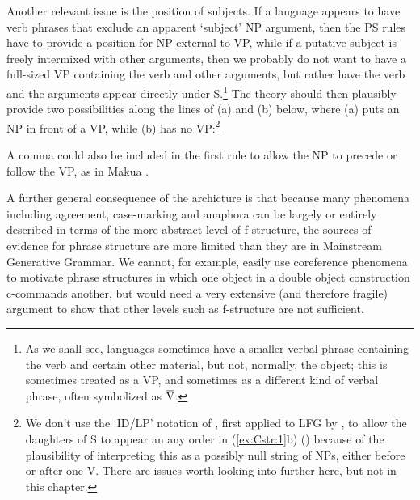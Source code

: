 \documentclass[output=paper,hidelinks]{langscibook}
\begin{document}
Another relevant issue is the position of subjects. If a language
appears to have verb phrases that exclude an apparent `subject' NP argument, then
the PS rules have to provide a position for NP external to VP, while if a
putative subject is freely intermixed with other arguments, then we probably
do not want to have a full-sized VP containing the verb and other arguments,
but rather have the verb and the arguments appear
directly under S.\footnote
 {As we shall see, languages sometimes have a smaller verbal phrase containing
 the verb and certain other material, but not, normally, the object; this is
 sometimes treated as a VP, and sometimes as a different kind of verbal phrase,
 often symbolized as $\overline{\hbox{V}}$.}
The theory should then plausibly provide two
possibilities along the lines of (a) and (b) below, where (a) puts an
NP in front of a VP, while (b) has no VP:\footnote
 {\label{IDLPfn}We don't use the  `ID/LP' notation of \citet{Gazdar1982}, first applied to LFG by
   \citet{Falk84}, to allow the daughters of S to appear an any order in (\ref{ex:Cstr:1}b) () because of the plausibility of interpreting this as a possibly null string of NPs, either before or after one V.  There are issues worth looking into further here, but not in this chapter.}

\ea
\begin{xlist}\label{ex:Cstr:1}
\item {}
\item {}
\end{xlist}
\z
A comma could also be included in the first rule to allow the NP to precede or follow the VP, as in Makua \citep{Stucky1983}.

A further general consequence of the archicture is that because many phenomena
including agreement, case-marking and anaphora can be largely or entirely
described in terms of the more abstract level of f-structure, the sources
of evidence for phrase structure are more limited than they are in Mainstream
Generative Grammar.  We cannot, for example, easily use coreference phenomena to motivate
phrase structures in which one object in a double object construction c-commands
another, but would need a very extensive (and therefore fragile) argument
to show that other levels such as f-structure are not sufficient.
\end{document}
